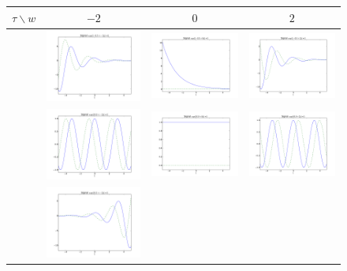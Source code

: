 \begin{figure}[ht]
  \centering
  \begin{tabular}{|c|ccc|}\hline
    $\tau \backslash w$ & $-2$ & $0$ & $2$ \\\hline
   \raisebox{9mm}{$-0.5$} 
    & \includegraphics[width=.25\linewidth]{imgs/sig_conv/sig_exp-1-1.pdf}
    & \includegraphics[width=.25\linewidth]{imgs/sig_conv/sig_exp-10.pdf}
    & \includegraphics[width=.25\linewidth]{imgs/sig_conv/sig_exp-11.pdf}\\
   \raisebox{9mm}{$0$} 
    & \includegraphics[width=.25\linewidth]{imgs/sig_conv/sig_exp0-1.pdf}
    & \includegraphics[width=.25\linewidth]{imgs/sig_conv/sig_exp00.pdf}
    & \includegraphics[width=.25\linewidth]{imgs/sig_conv/sig_exp01.pdf}\\
   \raisebox{9mm}{$.5$} 
    & \includegraphics[width=.25\linewidth]{imgs/sig_conv/sig_exp1-1.pdf}

\end{tabular}
\end{figure}
